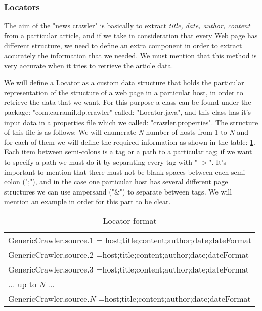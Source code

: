 \subsubsection{Locators}\label{locators}
The aim of the "news crawler" is basically to extract \textit{title, date, author, content} from a particular article, and if we take in consideration that every Web page has different structure, we need to define an extra component in order to extract accurately the information that we needed. We must mention that this method is very accurate when it tries to retrieve the article data.

We will define a Locator as a custom \gls{data structure} that holds the particular representation of the structure of a web page in a particular host, in order to retrieve the data that we want. For this purpose a class can be found under the package: "com.carramil.dp.crawler" called: "Locator.java", and this class has it's input data in a properties file which we called: "crawler.properties". The structure of this file is as follows: We will enumerate \textit{N} number of hosts from 1 to \textit{N} and for each of them we will define the required information as shown in the table: \ref{tab:locator}. Each item between semi-colons is a tag or a path to a particular tag; if we want to specify a path we must do it by separating every tag with "-$>$". It's important to mention that there must not be blank spaces between each semi-colon (";"), and in the case one particular host has several different page structures we can use ampersand ("\&") to separate between tags. We will mention an example in order for this part to be clear.

\begin{table}\centering
	\caption{Locator format}\label{tab:locator}
   	\begin{tabular}{p{11.5cm}}
   	\hline
GenericCrawler.source.1 = host;title;content;author;date;dateFormat\\
GenericCrawler.source.2 =host;title;content;author;date;dateFormat\\
GenericCrawler.source.3 =host;title;content;author;date;dateFormat\\
... up to \textit{N} ...\\
GenericCrawler.source.\textit{N} =host;title;content;author;date;dateFormat\\
    \hline
    \end{tabular}
\end{table}

